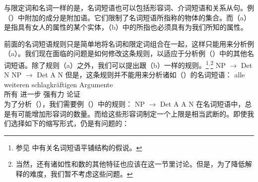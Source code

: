\noindent
与限定词和名词一样的是，名词短语也可以包括形容词、介词短语和关系从句。例（）中附加的成分是附加语。它们限制了名词短语所指称的物体的集合。而（a）是指具有女人的属性的某个实体，（b）中的所指也必须具有为我们所知的属性。

前面的名词短语规则只是简单地将名词和限定词组合在一起，这样只能用来分析例（a）。我们现在面临的问题是如何修改这条规则，以适应于分析例（）中的其他名词短语。除了规则（a）之外，我们可以提出跟（b）一样的规则。\footnote{%
参见 中有关名词短语平铺结构的假说。
}$^,$\footnote{%
当然，还有诸如性和数的其他特征也应该在这一节里讨论。但是，为了降低解释的难度，我们暂不考虑这些问题。
}
\eal
\ex NP $\to$ Det N
\ex NP $\to$ Det A N
\zl
但是，这条规则并不能用来分析诸如（）的名词短语：
\ea
\label{Beispiel-alle-weitern-schlagkraeftigen-Argumente}
\gll alle weiteren schlagkräftigen Argumente\\
	 所有 进一步 强有力 论证\\
\z
为了分析（），我们需要例（）中的规则：
\ea 
NP $\to$ Det A A N
\z
在名词短语中，总是有可能增加形容词的数量。而给这些形容词制定一个上限是相当武断的。即使我们选择如下的缩写形式，仍是有问题的：

